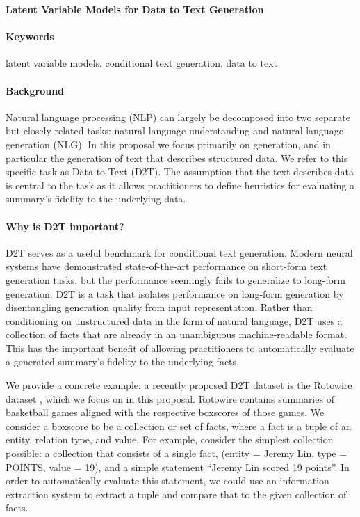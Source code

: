 \documentclass[11pt]{article}
\begin{document}

\begin{center}
\textbf{Latent Variable Models for Data to Text Generation}
\end{center}

\paragraph{Keywords}
latent variable models, conditional text generation, data to text

\paragraph{Background}
Natural language processing (NLP) can largely be decomposed into two separate but
closely related tasks: natural language understanding and natural language
generation (NLG).
In this proposal we focus primarily on generation, and in particular
the generation of text that describes structured data.
We refer to this specific task as Data-to-Text (D2T).
The assumption that the text describes data is central to the task as it allows
practitioners to define heuristics for evaluating a summary's fidelity to the
underlying data.

\paragraph{Why is D2T important?}
D2T serves as a useful benchmark for conditional text generation.
Modern neural systems have demonstrated state-of-the-art performance on short-form
text generation tasks, but the performance seemingly fails to generalize to long-form generation.
D2T is a task that isolates performance on long-form generation by disentangling 
generation quality from input representation.
Rather than conditioning on unstructured data in the form of natural language,
D2T uses a collection of facts that are already in an unambiguous machine-readable format.
This has the important benefit of allowing practitioners to automatically evaluate
a generated summary's fidelity to the underlying facts.

We provide a concrete example: a recently proposed D2T dataset is
the Rotowire dataset \citep{wiseman2017d2t},
which we focus on in this proposal.
Rotowire contains summaries of basketball games aligned with the respective
boxscores of those games.
We consider a boxscore to be a collection or set of facts,
where a fact is a tuple of an entity, relation type, and value.
For example, consider the simplest collection possible:
a collection that consists of a single fact, (entity = Jeremy Lin, type = POINTS, value = 19),
and a simple statement ``Jeremy Lin scored 19 points''.
In order to automatically evaluate this statement,
we could use an information extraction system to extract a tuple
and compare that to the given collection of facts.
\end{document}
